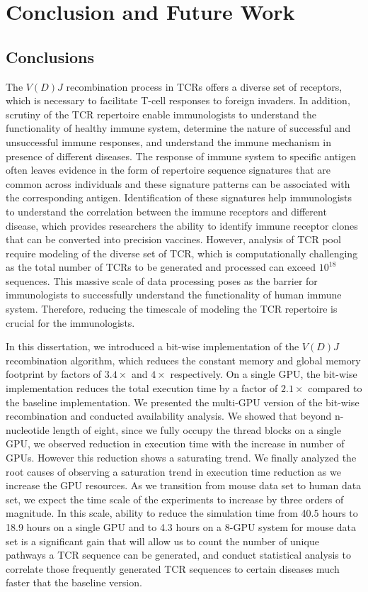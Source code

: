 \chapter{Conclusion and Future Work}\label{sec:Conclusion}
\section{Conclusions}
The $V(D)J$ recombination process in TCRs offers a diverse set of receptors, which is necessary to facilitate T-cell responses to foreign invaders. In addition, scrutiny of the TCR repertoire enable immunologists to understand the functionality of healthy immune system, determine the nature of successful and unsuccessful immune responses, and understand the immune mechanism in presence of different diseases. The response of immune system to specific antigen often leaves evidence in the form of repertoire sequence signatures that are common across individuals and these signature patterns can be associated with the corresponding antigen. Identification of these signatures help immunologists to understand the correlation between the immune receptors and different disease, which provides researchers the ability to identify immune receptor clones that can be converted into precision vaccines. However, analysis of TCR pool require modeling of the diverse set of TCR, which is computationally challenging as the total number of TCRs to be generated and processed can exceed $10^{18}$ sequences. This massive scale of data processing poses as the barrier for immunologists to successfully understand the functionality of human immune system. Therefore, reducing the timescale of modeling the TCR repertoire is crucial for the immunologists. 

In this dissertation, we introduced a bit-wise implementation of the $V(D)J$ recombination algorithm, which reduces the constant memory and global memory footprint by factors of $3.4\times$ and $4\times$ respectively. On a single GPU, the bit-wise implementation reduces the total execution time by a factor of $2.1\times$ compared to the baseline implementation. We presented the multi-GPU version of the bit-wise recombination and conducted availability analysis. We showed that beyond n-nucleotide length of eight, since we fully occupy the thread blocks on a single GPU, we observed reduction in execution time with the increase in number of GPUs.  However this reduction shows a saturating trend.  We finally analyzed the root causes of observing a saturation trend in execution time reduction as we increase the GPU resources. As we transition from mouse data set to human data set, we expect the time scale of the experiments to increase by three orders of magnitude. In this scale, ability to reduce the simulation time from 40.5 hours to 18.9 hours on a single GPU and to 4.3 hours on a 8-GPU system for mouse data set is a significant gain that will allow us to  count the number of unique pathways a TCR sequence can be generated, and conduct statistical analysis to correlate those frequently generated TCR sequences to certain diseases much faster that the baseline version. 


